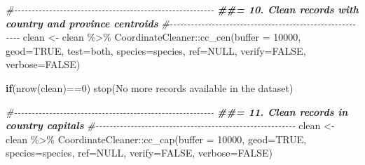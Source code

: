 \documentclass[
]{article}
\newenvironment{Shaded}{\begin{snugshade}}{\end{snugshade}}
\newcommand{\AttributeTok}[1]{\textcolor[rgb]{0.77,0.63,0.00}{#1}}
\newcommand{\CommentTok}[1]{\textcolor[rgb]{0.56,0.35,0.01}{\textit{#1}}}
\newcommand{\ConstantTok}[1]{\textcolor[rgb]{0.00,0.00,0.00}{#1}}
\newcommand{\ControlFlowTok}[1]{\textcolor[rgb]{0.13,0.29,0.53}{\textbf{#1}}}
\newcommand{\DecValTok}[1]{\textcolor[rgb]{0.00,0.00,0.81}{#1}}
\newcommand{\DocumentationTok}[1]{\textcolor[rgb]{0.56,0.35,0.01}{\textbf{\textit{#1}}}}
\newcommand{\FunctionTok}[1]{\textcolor[rgb]{0.00,0.00,0.00}{#1}}
\newcommand{\NormalTok}[1]{#1}
\newcommand{\OtherTok}[1]{\textcolor[rgb]{0.56,0.35,0.01}{#1}}
\newcommand{\SpecialCharTok}[1]{\textcolor[rgb]{0.00,0.00,0.00}{#1}}
\newcommand{\StringTok}[1]{\textcolor[rgb]{0.31,0.60,0.02}{#1}}
\begin{document}
\begin{Shaded}
\begin{Highlighting}[]
\CommentTok{\#{-}{-}{-}{-}{-}{-}{-}{-}{-}{-}{-}{-}{-}{-}{-}{-}{-}{-}{-}{-}{-}{-}{-}{-}{-}{-}{-}{-}{-}{-}{-}{-}{-}{-}{-}{-}{-}{-}{-}{-}{-}{-}{-}{-}{-}{-}{-}{-}{-}{-}{-}{-}{-}{-}{-}{-}{-}}
\DocumentationTok{\#\#= 10. Clean records with country and province centroids}
\CommentTok{\#{-}{-}{-}{-}{-}{-}{-}{-}{-}{-}{-}{-}{-}{-}{-}{-}{-}{-}{-}{-}{-}{-}{-}{-}{-}{-}{-}{-}{-}{-}{-}{-}{-}{-}{-}{-}{-}{-}{-}{-}{-}{-}{-}{-}{-}{-}{-}{-}{-}{-}{-}{-}{-}{-}{-}{-}{-}}
\NormalTok{clean }\OtherTok{\textless{}{-}}\NormalTok{ clean }\SpecialCharTok{\%\textgreater{}\%}
\NormalTok{  CoordinateCleaner}\SpecialCharTok{::}\FunctionTok{cc\_cen}\NormalTok{(}\AttributeTok{buffer =} \DecValTok{10000}\NormalTok{,}
                            \AttributeTok{geod=}\ConstantTok{TRUE}\NormalTok{,}
                            \AttributeTok{test=}\StringTok{\textquotesingle{}both\textquotesingle{}}\NormalTok{,}
                            \AttributeTok{species=}\StringTok{\textquotesingle{}species\textquotesingle{}}\NormalTok{,}
                            \AttributeTok{ref=}\ConstantTok{NULL}\NormalTok{,}
                            \AttributeTok{verify=}\ConstantTok{FALSE}\NormalTok{, }
                            \AttributeTok{verbose=}\ConstantTok{FALSE}\NormalTok{)}

\ControlFlowTok{if}\NormalTok{(}\FunctionTok{nrow}\NormalTok{(clean)}\SpecialCharTok{==}\DecValTok{0}\NormalTok{) }\FunctionTok{stop}\NormalTok{(}\StringTok{\textquotesingle{}No more records available in the dataset\textquotesingle{}}\NormalTok{)}

\CommentTok{\#{-}{-}{-}{-}{-}{-}{-}{-}{-}{-}{-}{-}{-}{-}{-}{-}{-}{-}{-}{-}{-}{-}{-}{-}{-}{-}{-}{-}{-}{-}{-}{-}{-}{-}{-}{-}{-}{-}{-}{-}{-}{-}{-}{-}{-}{-}{-}{-}{-}{-}{-}{-}{-}{-}{-}{-}{-}}
\DocumentationTok{\#\#= 11. Clean records in country capitals}
\CommentTok{\#{-}{-}{-}{-}{-}{-}{-}{-}{-}{-}{-}{-}{-}{-}{-}{-}{-}{-}{-}{-}{-}{-}{-}{-}{-}{-}{-}{-}{-}{-}{-}{-}{-}{-}{-}{-}{-}{-}{-}{-}{-}{-}{-}{-}{-}{-}{-}{-}{-}{-}{-}{-}{-}{-}{-}{-}{-}}
\NormalTok{clean }\OtherTok{\textless{}{-}}\NormalTok{ clean }\SpecialCharTok{\%\textgreater{}\%}
\NormalTok{  CoordinateCleaner}\SpecialCharTok{::}\FunctionTok{cc\_cap}\NormalTok{(}\AttributeTok{buffer =} \DecValTok{10000}\NormalTok{,}
                            \AttributeTok{geod=}\ConstantTok{TRUE}\NormalTok{,}
                            \AttributeTok{species=}\StringTok{\textquotesingle{}species\textquotesingle{}}\NormalTok{,}
                            \AttributeTok{ref=}\ConstantTok{NULL}\NormalTok{,}
                            \AttributeTok{verify=}\ConstantTok{FALSE}\NormalTok{,}
                            \AttributeTok{verbose=}\ConstantTok{FALSE}\NormalTok{)}


\end{Highlighting}
\end{Shaded}
\end{document}
